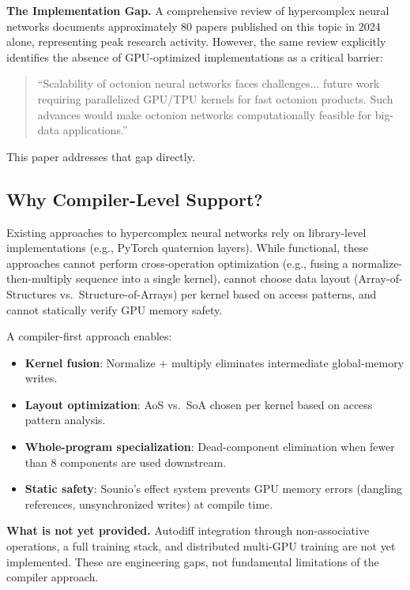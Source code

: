 \documentclass[11pt,a4paper]{article}
\begin{document}
\textbf{The Implementation Gap.} A comprehensive review of hypercomplex neural networks \cite{comminiello2024} documents approximately 80 papers published on this topic in 2024 alone, representing peak research activity. However, the same review explicitly identifies the absence of GPU-optimized implementations as a critical barrier:

\begin{quote}
``Scalability of octonion neural networks faces challenges... future work requiring parallelized GPU/TPU kernels for fast octonion products. Such advances would make octonion networks computationally feasible for big-data applications.''
\end{quote}

This paper addresses that gap directly.

\subsection{Why Compiler-Level Support?}

Existing approaches to hypercomplex neural networks rely on library-level implementations (e.g., PyTorch quaternion layers). While functional, these approaches cannot perform cross-operation optimization (e.g., fusing a normalize-then-multiply sequence into a single kernel), cannot choose data layout (Array-of-Structures vs.\ Structure-of-Arrays) per kernel based on access patterns, and cannot statically verify GPU memory safety.

A compiler-first approach enables:
\begin{itemize}
    \item \textbf{Kernel fusion}: Normalize + multiply eliminates intermediate global-memory writes.
    \item \textbf{Layout optimization}: AoS vs.\ SoA chosen per kernel based on access pattern analysis.
    \item \textbf{Whole-program specialization}: Dead-component elimination when fewer than 8 components are used downstream.
    \item \textbf{Static safety}: Sounio's effect system prevents GPU memory errors (dangling references, unsynchronized writes) at compile time.
\end{itemize}

\textbf{What is not yet provided.} Autodiff integration through non-associative operations, a full training stack, and distributed multi-GPU training are not yet implemented. These are engineering gaps, not fundamental limitations of the compiler approach.
\end{document}
